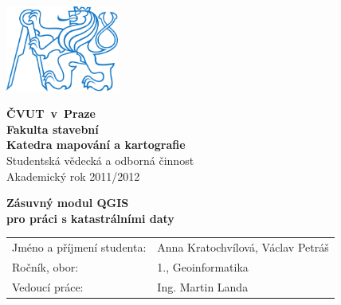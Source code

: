 {
\newcommand{\napisCVUT}{ČVUT~v~Praze}
\newcommand{\napisFS}{Fakulta stavební}
\newcommand{\napisSVOC}{Studentská vědecká a odborná činnost}
\newcommand{\napisAK}{Akademický rok  2011/2012}
\newcommand{\napisObor}{Geoinformatika}
\newcommand{\napisKatedra}{Katedra mapování a kartografie}
\newcommand{\napisVedouci}{Ing. Martin Landa}
\newcommand{\napisAutor}{Anna Kratochvílová, Václav Petráš}
\newcommand{\napisRocnik}{1.}
\newcommand{\napisNazevI}{Zásuvný modul QGIS}
\newcommand{\napisNazevII}{pro práci s katastrálními daty}

\pagestyle{empty}
\begin{minipage}{0.2\textwidth}
\includegraphics[width=3.7cm]{logo_cvut_modre}
\end{minipage}
\hfill
\begin{minipage}{0.7\textwidth}
\begin{flushright}
\textsf{
\textbf{
\Large
\napisCVUT\\
\napisFS\\
\napisKatedra\\
}
\Large
\napisSVOC\\
\napisAK
}
\end{flushright}
\end{minipage}


\begin{center}
\vfill
\textsf{
\textbf{
\Huge
\napisNazevI\\
\napisNazevII\\
}}
\vfill
\end{center}

\newcommand{\rtu}[2]{\textsf{#1}&\textsf{#2}\\}
\begin{tabular}{ll}
\rtu{Jméno a příjmení studenta:}{\napisAutor}
\rtu{Ročník, obor:}{\napisRocnik, \napisObor}
\rtu{Vedoucí práce:}{\napisVedouci}
\end{tabular}
}
